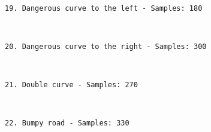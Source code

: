 \documentclass[11pt]{article}
\begin{document}
    \begin{center}
    \end{center}
    { \hspace*{\fill} \\}
    
    \begin{Verbatim}[commandchars=\\\{\}]
19. Dangerous curve to the left - Samples: 180

    \end{Verbatim}

    \begin{center}
    \end{center}
    { \hspace*{\fill} \\}
    
    \begin{Verbatim}[commandchars=\\\{\}]
20. Dangerous curve to the right - Samples: 300

    \end{Verbatim}

    \begin{center}
    \end{center}
    { \hspace*{\fill} \\}
    
    \begin{Verbatim}[commandchars=\\\{\}]
21. Double curve - Samples: 270

    \end{Verbatim}

    \begin{center}
    \end{center}
    { \hspace*{\fill} \\}
    
    \begin{Verbatim}[commandchars=\\\{\}]
22. Bumpy road - Samples: 330

    \end{Verbatim}

    \begin{center}
    \end{center}
    { \hspace*{\fill} \\}
    
\end{document}
